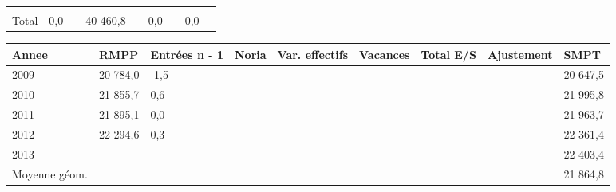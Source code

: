 \begin{longtable}[]{@{}lllllllll@{}}
\begin{minipage}[t]{0.06\columnwidth}
\strut
\end{minipage} & \begin{minipage}[t]{0.13\columnwidth}\raggedright
\strut
\end{minipage} & \begin{minipage}[t]{0.06\columnwidth}\raggedright
\strut
\end{minipage} & \begin{minipage}[t]{0.05\columnwidth}\raggedright
\strut
\end{minipage} & \begin{minipage}[t]{0.06\columnwidth}\raggedright
\strut
\end{minipage}\tabularnewline
\begin{minipage}[t]{0.05\columnwidth}\raggedright
Total\strut
\end{minipage} & \begin{minipage}[t]{0.10\columnwidth}\raggedright
0,0\strut
\end{minipage} & \begin{minipage}[t]{0.06\columnwidth}\raggedright
\strut
\end{minipage} & \begin{minipage}[t]{0.17\columnwidth}\raggedright
40 460,8\strut
\end{minipage} & \begin{minipage}[t]{0.06\columnwidth}\raggedright
\strut
\end{minipage} & \begin{minipage}[t]{0.13\columnwidth}\raggedright
0,0\strut
\end{minipage} & \begin{minipage}[t]{0.06\columnwidth}\raggedright
\strut
\end{minipage} & \begin{minipage}[t]{0.05\columnwidth}\raggedright
0,0\strut
\end{minipage} & \begin{minipage}[t]{0.06\columnwidth}\raggedright
\strut
\end{minipage}\tabularnewline
\bottomrule
\end{longtable}

\begin{longtable}[]{@{}lllllllll@{}}
\toprule
Annee & RMPP & Entrées n - 1 & Noria & Var. effectifs & Vacances & Total
E/S & Ajustement & SMPT\tabularnewline
\midrule
\endhead
2009 & 20 784,0 & -1,5 & & & & & & 20 647,5\tabularnewline
2010 & 21 855,7 & 0,6 & & & & & & 21 995,8\tabularnewline
2011 & 21 895,1 & 0,0 & & & & & & 21 963,7\tabularnewline
2012 & 22 294,6 & 0,3 & & & & & & 22 361,4\tabularnewline
2013 & & & & & & & & 22 403,4\tabularnewline
Moyenne géom. & & & & & & & & 21 864,8\tabularnewline
\bottomrule
\end{longtable}


